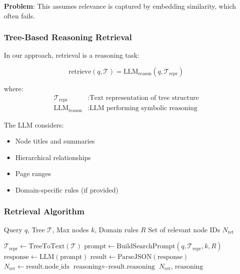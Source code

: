 \documentclass[12pt,a4paper]{article}
\begin{document}
\textbf{Problem}: This assumes relevance is captured by embedding similarity, which often fails.

\subsubsection{Tree-Based Reasoning Retrieval}

In our approach, retrieval is a reasoning task:

\begin{equation}
\text{retrieve}(q, \mathcal{T}) = \text{LLM}_{\text{reason}}(q, \mathcal{T}_{\text{repr}})
\end{equation}

where:
\begin{align*}
\mathcal{T}_{\text{repr}} &: \text{Text representation of tree structure} \\
\text{LLM}_{\text{reason}} &: \text{LLM performing symbolic reasoning}
\end{align*}

The LLM considers:
\begin{itemize}
    \item Node titles and summaries
    \item Hierarchical relationships
    \item Page ranges
    \item Domain-specific rules (if provided)
\end{itemize}

\subsubsection{Retrieval Algorithm}

\begin{algorithm}[H]
\caption{LLM Tree Search}
\begin{algorithmic}[1]
\Require Query $q$, Tree $\mathcal{T}$, Max nodes $k$, Domain rules $R$
\Ensure Set of relevant node IDs $N_{\text{ret}}$

\State $\mathcal{T}_{\text{repr}} \gets \text{TreeToText}(\mathcal{T})$
\State $\text{prompt} \gets \text{BuildSearchPrompt}(q, \mathcal{T}_{\text{repr}}, k, R)$
\State $\text{response} \gets \text{LLM}(\text{prompt})$
\State $\text{result} \gets \text{ParseJSON}(\text{response})$
\State $N_{\text{ret}} \gets \text{result.node\_ids}$
\State $\text{reasoning} \gets \text{result.reasoning}$
\State \Return $N_{\text{ret}}$, $\text{reasoning}$
\end{algorithmic}
\end{algorithm}
\end{document}
